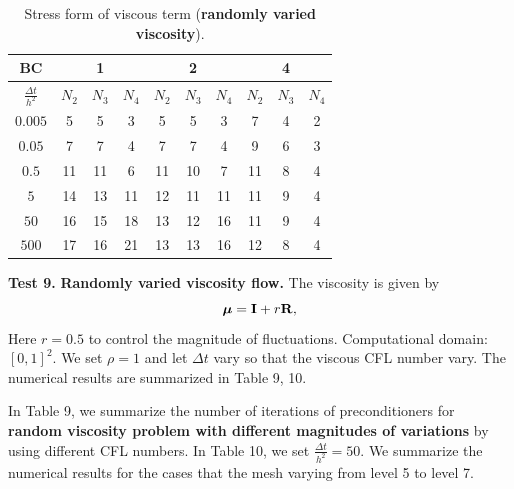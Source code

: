 \documentclass[9pt]{article}
\newcommand{\V}[1]{\boldsymbol{#1}}
\begin{document}
\begin{table}[h]
\begin{center}
\begin{tabular}{|c||ccc|ccc|ccc|}
\hline
BC     &     &1    &    &    &2   &     &   &4     & \\
\hline
$\frac{\Delta t}{h^2}$  &$N_2$ &$N_3$ &$N_4$   &$N_2$ &$N_3$ &$N_4$   &$N_2$ & $N_3$ &$N_4$  \\
\hline
\hline
$0.005$    &5  &5  &3     &5  &5  &3     &7   &4   &2 \\
\hline
$0.05$     &7  &7  &4     &7  &7  &4     &9   &6   &3\\
\hline
$0.5$     &11 &11  &6     &11 &10 &7     &11  &8   &4\\
\hline
$5$       &14 &13  &11    &12 &11 &11    &11  &9   &4\\
\hline
$50$      &16  &15  &18   &13 &12 &16    &11  &9   &4\\   %
\hline
$500$     &17  &16  &21   &13 &13 &16    &12  &8  &4\\
\hline
\end{tabular}
\vspace{2mm} \caption{Stress form of viscous term ({\bf randomly varied viscosity}).
}
\end{center}
\end{table}

{\bf Test 9.} {\bf Randomly varied viscosity flow.} The viscosity is given by
$$
{\V{\mu}}  = {\bf I}+ r {\bf R},
$$
Here $r=0.5$ to control the magnitude of fluctuations. Computational domain: $[0, 1]^2$. We set $\rho=1$ and let $\Delta t$ vary so that the viscous CFL number vary. The numerical results are summarized in Table 9, 10.

In Table 9, we summarize the number of iterations of preconditioners for {\bf random viscosity problem with different magnitudes of variations} by using different CFL numbers. In Table 10, we set $\frac{\Delta t}{h^2}=50$. We summarize the numerical results for the cases that the mesh varying from level 5 to level 7.
\end{document}
